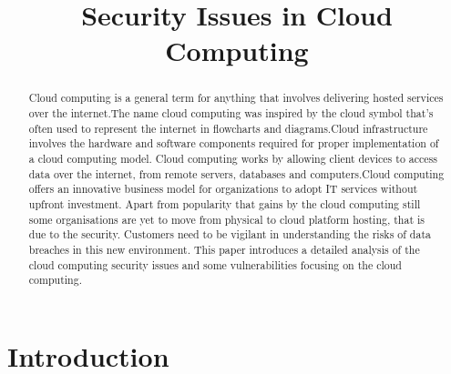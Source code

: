 \documentclass[conference]{IEEEtran}
\begin{document}
\title{ Security Issues in Cloud Computing 
}

\author{
\and
{}
}

\maketitle

\begin{abstract}

Cloud computing is a general term for anything that involves delivering hosted services over the internet.The name cloud computing was inspired by the cloud symbol that's often used to represent the internet in flowcharts and diagrams.Cloud infrastructure involves the hardware and software components required for proper implementation of a cloud computing model. Cloud computing works by allowing client devices to access data over the internet, from remote servers, databases and computers.Cloud computing offers an innovative business model for organizations to adopt IT services without upfront investment. Apart from popularity that gains by the cloud computing still some organisations are yet to move from physical to cloud platform hosting, that is due to the security. Customers need to be vigilant in understanding the risks of data breaches in this new environment. This paper introduces a detailed analysis of the cloud computing security issues and some vulnerabilities focusing on the cloud computing.

\end{abstract}

\section{Introduction}
\end{document}
